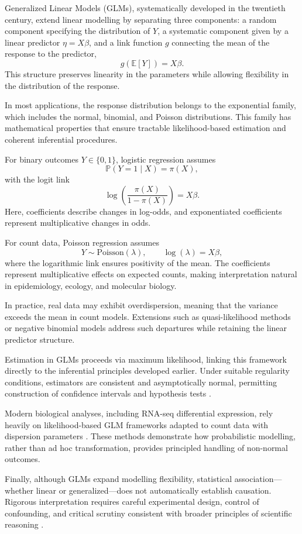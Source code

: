 \medskip

Generalized Linear Models (GLMs), systematically developed in the twentieth century, extend linear modelling by separating three components: a random component specifying the distribution of \(Y\), a systematic component given by a linear predictor \(\eta = X\beta\), and a link function \(g\) connecting the mean of the response to the predictor,
\[
g(\mathbb{E}[Y]) = X\beta.
\]
This structure preserves linearity in the parameters while allowing flexibility in the distribution of the response.

\medskip

In most applications, the response distribution belongs to the exponential family, which includes the normal, binomial, and Poisson distributions. This family has mathematical properties that ensure tractable likelihood-based estimation and coherent inferential procedures.

\medskip

For binary outcomes \(Y \in \{0,1\}\), logistic regression assumes
\[
\mathbb{P}(Y=1 \mid X) = \pi(X),
\]
with the logit link
\[
\log\!\left(\frac{\pi(X)}{1-\pi(X)}\right) = X\beta.
\]
Here, coefficients describe changes in log-odds, and exponentiated coefficients represent multiplicative changes in odds.

\medskip

For count data, Poisson regression assumes
\[
Y \sim \text{Poisson}(\lambda),
\qquad
\log(\lambda) = X\beta,
\]
where the logarithmic link ensures positivity of the mean. The coefficients represent multiplicative effects on expected counts, making interpretation natural in epidemiology, ecology, and molecular biology.

\medskip

In practice, real data may exhibit overdispersion, meaning that the variance exceeds the mean in count models. Extensions such as quasi-likelihood methods or negative binomial models address such departures while retaining the linear predictor structure.

\medskip

Estimation in GLMs proceeds via maximum likelihood, linking this framework directly to the inferential principles developed earlier. Under suitable regularity conditions, estimators are consistent and asymptotically normal, permitting construction of confidence intervals and hypothesis tests \cite{cox_2006_principles}.

\medskip

Modern biological analyses, including RNA-seq differential expression, rely heavily on likelihood-based GLM frameworks adapted to count data with dispersion parameters \cite{love_2014_deseq2}. These methods demonstrate how probabilistic modelling, rather than ad hoc transformation, provides principled handling of non-normal outcomes.

\medskip

Finally, although GLMs expand modelling flexibility, statistical association—whether linear or generalized—does not automatically establish causation. Rigorous interpretation requires careful experimental design, control of confounding, and critical scrutiny consistent with broader principles of scientific reasoning \cite{popper_1934_logic,mayo_2018_severe}.
